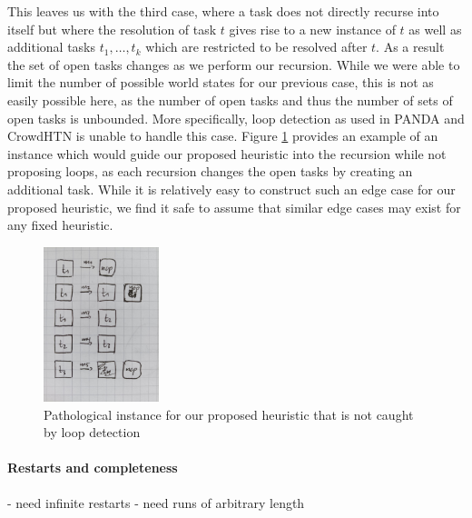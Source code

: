This leaves us with the third case, where a task does not directly recurse into itself but where the resolution of task $t$ gives rise to a new instance of $t$ as well as additional tasks $t_1, \ldots, t_k$ which are restricted to be resolved after $t$. As a result the set of open tasks changes as we perform our recursion. While we were able to limit the number of possible world states for our previous case, this is not as easily possible here, as the number of open tasks and thus the number of sets of open tasks is unbounded. More specifically, loop detection as used in PANDA and CrowdHTN is unable to handle this case. Figure \ref{figure: pathological heuristic loop} provides an example of an instance which would guide our proposed heuristic into the recursion while not proposing loops, as each recursion changes the open tasks by creating an additional task. While it is relatively easy to construct such an edge case for our proposed heuristic, we find it safe to assume that similar edge cases may exist for any fixed heuristic.
 \\
\begin{figure}
	\caption{Pathological instance for our proposed heuristic that is not caught by loop detection}
	\label{figure: pathological heuristic loop}
	\centering
	\includegraphics[width=0.3\textwidth]{images/prelim/loop_detection_pathological}
\end{figure}

\paragraph{Restarts and completeness}
- need infinite restarts
- need runs of arbitrary length

